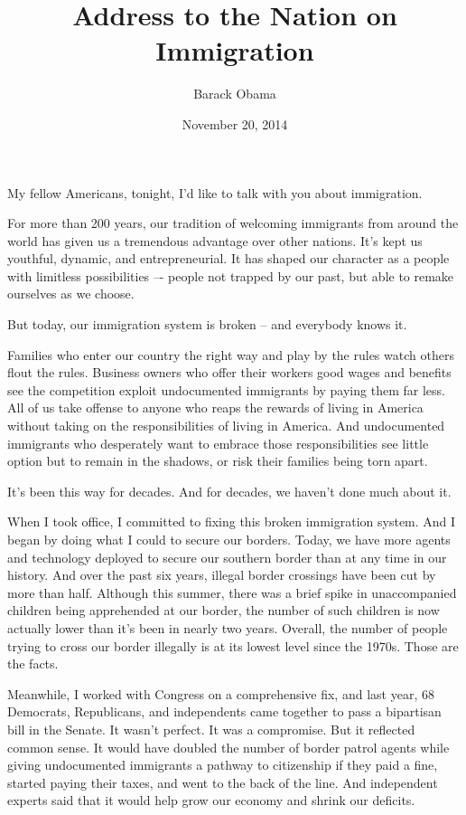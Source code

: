 \documentclass[10pt,a4paper]{article}
\begin{document}
\title{Address to the Nation on Immigration}
\date{November 20, 2014}
\author{Barack Obama}

\maketitle

\noindent\linenumbers My fellow Americans, tonight, I’d like to talk with you about immigration.

For more than 200 years, our tradition of welcoming immigrants from around the world has given us a tremendous advantage over other nations. It’s kept us youthful, dynamic, and entrepreneurial. It has shaped our character as a people with limitless possibilities –- people not trapped by our past, but able to remake ourselves as we choose.

But today, our immigration system is broken -- and everybody knows it.

Families who enter our country the right way and play by the rules watch others flout the rules. Business owners who offer their workers good wages and benefits see the competition exploit undocumented immigrants by paying them far less. All of us take offense to anyone who reaps the rewards of living in America without taking on the responsibilities of living in America. And undocumented immigrants who desperately want to embrace those responsibilities see little option but to remain in the shadows, or risk their families being torn apart.

It’s been this way for decades. And for decades, we haven’t done much about it.

When I took office, I committed to fixing this broken immigration system. And I began by doing what I could to secure our borders. Today, we have more agents and technology deployed to secure our southern border than at any time in our history. And over the past six years, illegal border crossings have been cut by more than half. Although this summer, there was a brief spike in unaccompanied children being apprehended at our border, the number of such children is now actually lower than it’s been in nearly two years. Overall, the number of people trying to cross our border illegally is at its lowest level since the 1970s. Those are the facts.

Meanwhile, I worked with Congress on a comprehensive fix, and last year, 68 Democrats, Republicans, and independents came together to pass a bipartisan bill in the Senate. It wasn’t perfect. It was a compromise. But it reflected common sense. It would have doubled the number of border patrol agents while giving undocumented immigrants a pathway to citizenship if they paid a fine, started paying their taxes, and went to the back of the line. And independent experts said that it would help grow our economy and shrink our deficits.
\end{document}
